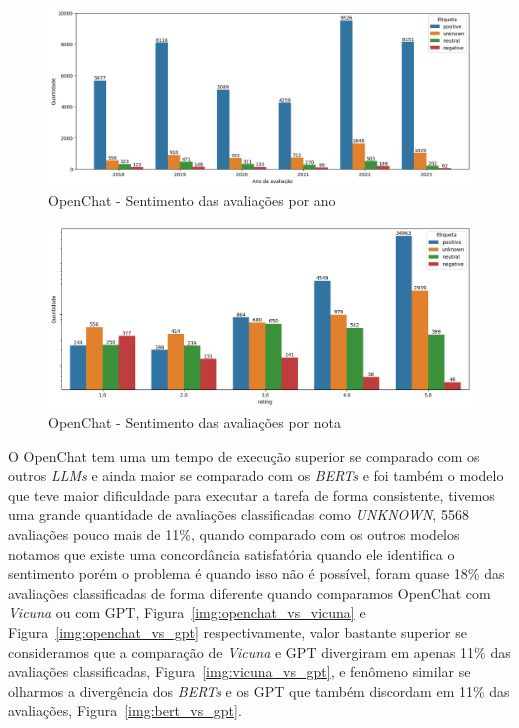 \begin{figure}
	\centering
	\includegraphics[width=1\textwidth]{figs/openchat/sentimento_ano.png}
	\caption{OpenChat - Sentimento das avaliações por ano}
	\label{img:openchat_sentimento_ano}
\end{figure}

\begin{figure}
	\centering
	\includegraphics[width=1\textwidth]{figs/openchat/sentimento_nota.png}
	\caption{OpenChat - Sentimento das avaliações por nota}
	\label{img:openchat_sentimento_nota}
\end{figure}

O OpenChat tem uma um tempo de execução superior se comparado com os outros \textit{LLMs} e ainda maior se comparado com os \textit{BERTs} e foi também o modelo que teve maior dificuldade para executar a tarefa de forma consistente, tivemos uma grande quantidade de avaliações classificadas como \textit{UNKNOWN}, 5568 avaliações pouco mais de 11\%, quando comparado com os outros modelos notamos que existe uma concordância satisfatória quando ele identifica o sentimento porém o problema é quando isso não é possível, foram quase 18\% das avaliações classificadas de forma diferente quando comparamos OpenChat com \textit{Vicuna} ou com GPT, Figura~\ref{img:openchat_vs_vicuna} e Figura~\ref{img:openchat_vs_gpt} respectivamente, valor bastante superior se consideramos que a comparação de \textit{Vicuna} e GPT divergiram em apenas 11\% das avaliações classificadas, Figura~\ref{img:vicuna_vs_gpt}, e fenômeno similar se olharmos a divergência dos \textit{BERTs} e os GPT que também discordam em 11\% das avaliações, Figura~\ref{img:bert_vs_gpt}.


